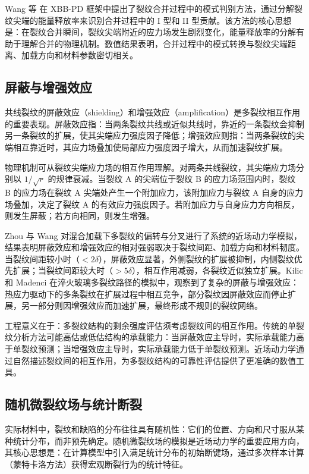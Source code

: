 Wang 等 \cite{Wang2023} 在 XBB-PD 框架中提出了裂纹合并过程中的模式判别方法，通过分解裂纹尖端的能量释放率来识别合并过程中的 I 型和 II 型贡献。该方法的核心思想是：在裂纹合并瞬间，裂纹尖端附近的应力场发生剧烈变化，能量释放率的分解有助于理解合并的物理机制。数值结果表明，合并过程中的模式转换与裂纹尖端距离、加载方向和材料参数密切相关。

\subsection{屏蔽与增强效应}\label{sec:ch11-shielding}

共线裂纹的屏蔽效应（shielding）和增强效应（amplification）是多裂纹相互作用的重要表现。屏蔽效应指：当两条裂纹共线或近似共线时，靠近的一条裂纹会抑制另一条裂纹的扩展，使其尖端应力强度因子降低；增强效应则指：当两条裂纹的尖端相互靠近时，其应力场叠加使局部应力强度因子增大，从而加速裂纹扩展。

物理机制可从裂纹尖端应力场的相互作用理解。对两条共线裂纹，其尖端应力场分别以 $1/\sqrt{r}$ 的规律衰减。当裂纹 A 的尖端位于裂纹 B 的应力场范围内时，裂纹 B 的应力场在裂纹 A 尖端处产生一个附加应力，该附加应力与裂纹 A 自身的应力场叠加，决定了裂纹 A 的有效应力强度因子。若附加应力与自身应力方向相反，则发生屏蔽；若方向相同，则发生增强。

Zhou 与 Wang \cite{ZhouWang2016} 对混合加载下多裂纹的偏转与分叉进行了系统的近场动力学模拟，结果表明屏蔽效应和增强效应的相对强弱取决于裂纹间距、加载方向和材料韧度。当裂纹间距较小时（$<2\delta$），屏蔽效应显著，外侧裂纹的扩展被抑制，内侧裂纹优先扩展；当裂纹间距较大时（$>5\delta$），相互作用减弱，各裂纹近似独立扩展。Kilic 和 Madenci \cite{KilicMadenci2009} 在淬火玻璃多裂纹路径的模拟中，观察到了复杂的屏蔽与增强效应：热应力驱动下的多条裂纹在扩展过程中相互竞争，部分裂纹因屏蔽效应而停止扩展，另一部分则因增强效应而加速扩展，最终形成不规则的裂纹网络。

工程意义在于：多裂纹结构的剩余强度评估须考虑裂纹间的相互作用。传统的单裂纹分析方法可能高估或低估结构的承载能力：当屏蔽效应主导时，实际承载能力高于单裂纹预测；当增强效应主导时，实际承载能力低于单裂纹预测。近场动力学通过自然描述裂纹间的相互作用，为多裂纹结构的可靠性评估提供了更准确的数值工具。

\subsection{随机微裂纹场与统计断裂}\label{sec:ch11-random-cracks}

实际材料中，裂纹和缺陷的分布往往具有随机性：它们的位置、方向和尺寸服从某种统计分布，而非预先确定。随机微裂纹场的模拟是近场动力学的重要应用方向，其核心思想是：在计算模型中引入满足统计分布的初始断键场，通过多次样本计算（蒙特卡洛方法）获得宏观断裂行为的统计特征。

